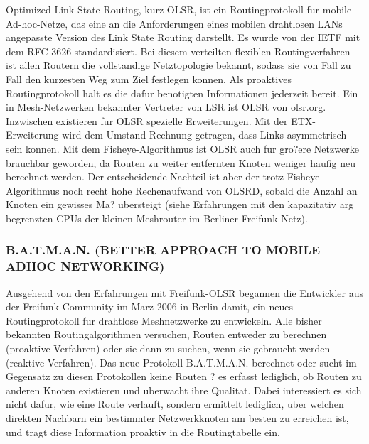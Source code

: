 Optimized Link State Routing, kurz OLSR, ist ein Routingprotokoll
fur mobile Ad-hoc-Netze, das eine an die Anforderungen eines mobilen
drahtlosen LANs angepasste Version des Link State Routing darstellt. Es
wurde von der IETF mit dem RFC 3626 standardisiert. Bei diesem
verteilten flexiblen Routingverfahren ist allen Routern die vollstandige
Netztopologie bekannt, sodass sie von Fall zu Fall den kurzesten Weg zum
Ziel festlegen konnen. Als proaktives Routingprotokoll halt es die dafur
benotigten Informationen jederzeit bereit.   Ein in Mesh-Netzwerken
bekannter Vertreter von LSR ist OLSR von olsr.org. Inzwischen existieren
fur OLSR spezielle Erweiterungen. Mit der ETX-Erweiterung wird dem
Umstand Rechnung getragen, dass Links asymmetrisch sein konnen. Mit
dem Fisheye-Algorithmus ist OLSR auch fur gro?ere Netzwerke brauchbar
geworden, da Routen zu weiter entfernten Knoten weniger haufig neu
berechnet werden. Der entscheidende Nachteil ist aber der trotz
Fisheye-Algorithmus noch recht hohe Rechenaufwand von OLSRD, sobald
die Anzahl an Knoten ein gewisses Ma? ubersteigt (siehe Erfahrungen mit
den kapazitativ arg begrenzten CPUs der kleinen Meshrouter im Berliner
Freifunk-Netz).  

\subsubsection{B.A.T.M.A.N. (BETTER APPROACH TO MOBILE ADHOC NETWORKING)}

Ausgehend von den Erfahrungen mit Freifunk-OLSR begannen die Entwickler
aus der Freifunk-Community im Marz 2006 in Berlin damit, ein neues
Routingprotokoll fur drahtlose Meshnetzwerke zu entwickeln. Alle bisher
bekannten Routingalgorithmen versuchen, Routen entweder zu berechnen
(proaktive Verfahren) oder sie dann zu suchen, wenn sie gebraucht werden
(reaktive Verfahren). Das neue Protokoll B.A.T.M.A.N. berechnet oder
sucht im Gegensatz zu diesen Protokollen keine Routen ? es erfasst
lediglich, ob Routen zu anderen Knoten existieren und uberwacht ihre
Qualitat. Dabei interessiert es sich nicht dafur, wie eine Route verlauft,
sondern ermittelt lediglich, uber welchen direkten Nachbarn ein bestimmter
Netzwerkknoten am besten zu erreichen ist, und tragt diese Information
proaktiv in die Routingtabelle ein. 

